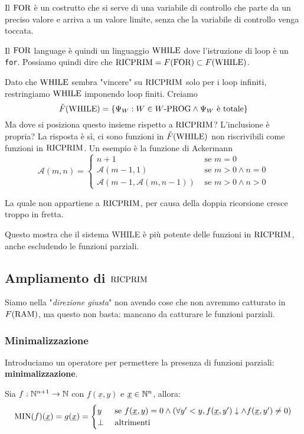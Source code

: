 Il $\text{FOR}$ è un costrutto che si serve di una variabile di controllo che parte da un preciso valore e arriva a un valore limite, senza che la variabile di controllo venga toccata.

Il $\text{FOR}$ language è quindi un linguaggio $\text{WHILE}$ dove l'istruzione di loop è un \texttt{for}. Possiamo quindi dire che $\text{RICPRIM} = F(\text{FOR}) \subset F(\text{WHILE})$.

Dato che $\text{WHILE}$ sembra "vincere" su $\text{RICPRIM}$ solo per i loop infiniti, restringiamo $\text{WHILE}$ imponendo loop finiti. Creiamo
$$ \tilde F (\text{WHILE}) = \{ \Psi_W: W \in W\text{-PROG} \wedge \Psi_W \text{ è totale}\}$$
Ma dove si posiziona questo insieme rispetto a $\text{RICPRIM}$? L'inclusione è propria? La risposta è sì, ci sono funzioni in $\tilde F (\text{WHILE})$ non riscrivibili come funzioni in $\text{RICPRIM}$. Un esempio è la funzione di Ackermann
$$ 
\mathcal{A} (m,n) = \begin{cases}
	n + 1 & \text{ se } m = 0 \\
	\mathcal{A}(m-1, 1) & \text{ se } m > 0 \wedge n = 0 \\
	\mathcal{A}(m-1, \mathcal{A}(m, n-1)) & \text{ se } m > 0 \wedge n > 0
\end{cases}
$$

La quale non appartiene a $\text{RICPRIM}$, per causa della doppia ricorsione cresce troppo in fretta.

Questo mostra che il sistema WHILE è più potente delle funzioni in $\text{RICPRIM}$, anche escludendo le funzioni parziali.

\subsection{Ampliamento di $\text{RICPRIM}$}
Siamo nella "\textit{direzione giusta}" non avendo cose che non avremmo catturato in $F(\text{RAM})$, ma questo non basta: mancano da catturare le funzioni parziali.

\begin{center}
	\scalebox{0.8}{}
\end{center}

\subsubsection{Minimalizzazione}

Introduciamo un operatore per permettere la presenza di funzioni parziali: \textbf{minimalizzazione}. 

Sia $f: \mathbb{N}^{n+1} \rightarrow \mathbb{N}$ con $f(\underline{x}, y)$ e $\underline{x} \in \mathbb{N}^n$, allora: 
$$
\operatorname{MIN} (f) (\underline{x}) = g(\underline{x}) = \begin{cases}
	y & \text{ se } f(\underline{x}, y) = 0 \wedge (\forall y' < y, f(\underline{x}, y') \downarrow \wedge f(\underline{x}, y') \neq 0) \\
	\bot & \text{ altrimenti}
\end{cases}
$$

